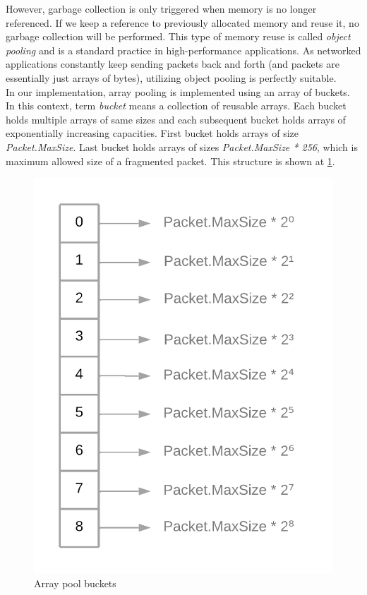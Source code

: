 \documentclass[times, utf8, diplomski]{fer}
\begin{document}
However, garbage collection is only triggered when memory is no longer referenced. If we keep a reference to previously allocated memory and reuse it, no garbage collection will be performed. This type of memory reuse is called \textit{object pooling} and is a standard practice in high-performance applications. As networked applications constantly keep sending packets back and forth (and packets are essentially just arrays of bytes), utilizing object pooling is perfectly suitable.\\

In our implementation, array pooling is implemented using an array of buckets. In this context, term \textit{bucket} means a collection of reusable arrays. Each bucket holds multiple arrays of same sizes and each subsequent bucket holds arrays of exponentially increasing capacities. First bucket holds arrays of size \textit{Packet.MaxSize}. Last bucket holds arrays of sizes \textit{Packet.MaxSize * 256}, which is maximum allowed size of a fragmented packet. This structure is shown at \ref{fig:array-pool-buckets}.


\begin{figure}[H]
	\centering
	\includegraphics[scale=0.23]{Array-pool-buckets}
	\caption{Array pool buckets}
	\label{fig:array-pool-buckets}
\end{figure}
\end{document}
